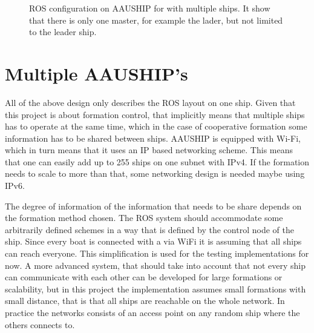 \begin{figure}[htbp]
	\centering
	
	\caption{ROS configuration on AAUSHIP for with multiple ships. It
	show that there is only one master, for example the lader, but not
	limited to the leader ship.}
	\label{fig:ros-aauship-multi}
\end{figure}

\section{Multiple AAUSHIP's}
All of the above design only describes the ROS layout on one ship.
Given that this project is about formation control, that implicitly
means that multiple ships has to operate at the same time, which in
the case of cooperative formation some information has to be shared
between ships. AAUSHIP is equipped with Wi-Fi, which in turn means that
it uses an \ac{IP} based networking scheme. This means that one can
easily add up to 255 ships on one subnet with \ac{IPv4}. If the
formation needs to scale to more than that, some networking design is
needed maybe using \ac{IPv6}.

The degree of information of the information that needs to be share
depends on the formation method chosen. The \ac{ROS} system should
accommodate some arbitrarily defined schemes in a way that is defined
by the control node of the ship. Since every boat is connected with a
via WiFi it is assuming that all ships can reach everyone. This
simplification is used for the testing implementations for now. A more
advanced system, that should take into account that not every ship can
communicate with each other can be developed for large formations or
scalability, but in this project the implementation assumes small
formations with small distance, that is that all ships are reachable
on the whole network. In practice the networks consists of an access
point on any random ship where the others connects to.
